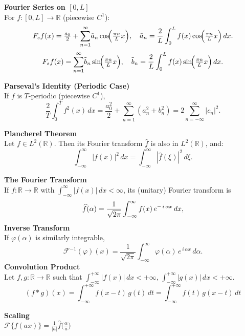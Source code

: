 \documentclass[8pt]{article}
\begin{document}
\begin{multicols}{2}
	\noindent \textbf{Fourier Series on $[0,L]$}\\
	For $f:[0,L]\to \mathbb{R}$ (piecewise $C^1$):
	\[
		F_{c}f(x)=\tfrac{\tilde a_{0}}{2} + \sum_{n=1}^{\infty}\!\tilde a_{n}\cos\!\Bigl(\tfrac{\pi n}{L}x\Bigr),
		\quad \tilde a_{n}=\frac{2}{L}\int_{0}^{L} f(x)\cos\!\Bigl(\tfrac{\pi n}{L}x\Bigr)\,dx.
	\]
	\[
		F_{s}f(x)=\sum_{n=1}^{\infty}\!\tilde b_{n}\sin\!\Bigl(\tfrac{\pi n}{L}x\Bigr),
		\quad \tilde b_{n}=\frac{2}{L}\int_{0}^{L} f(x)\sin\!\Bigl(\tfrac{\pi n}{L}x\Bigr)\,dx.
	\]

	\noindent \textbf{Parseval's Identity (Periodic Case)}\\
	If $f$ is $T$-periodic (piecewise $C^1$),
	\[
		\frac{2}{T}\int_{0}^{T} f^{2}(x)\,dx
		= \frac{a_{0}^{2}}{2} + \sum_{n=1}^{\infty}(a_{n}^{2}+b_{n}^{2})
		= 2\sum_{n=-\infty}^{\infty}\!\!\bigl|c_{n}\bigr|^{2}.
	\]

	\noindent \textbf{Plancherel Theorem}\\
	Let $f \in L^2(\mathbb{R})$. Then its Fourier transform $\hat{f}$ is also in $L^2(\mathbb{R})$, and:
	\[
		\int_{-\infty}^\infty |f(x)|^2 \, dx
		= \int_{-\infty}^\infty |\hat{f}(\xi)|^2 \, d\xi.
	\]

	\noindent \textbf{The Fourier Transform}\\
	If $f:\mathbb{R}\to\mathbb{R}$ with $\int_{-\infty}^{\infty}\!|f(x)|\,dx<\infty$, its (unitary) Fourier transform is
	\[
		\widehat{f}(\alpha)=\frac{1}{\sqrt{2\pi}}
		\int_{-\infty}^{\infty} f(x)\, e^{-\,i\,\alpha x}\,dx, \vspace{-10px}
	\]
	\noindent \textbf{Inverse Transform}\\
	If $\varphi(\alpha)$ is similarly integrable,
	\[
		\mathcal{F}^{-1}(\varphi)(x)= \frac{1}{\sqrt{2\pi}}
		\int_{-\infty}^{\infty}\!\varphi(\alpha)\,e^{\,i\,\alpha x}\,d\alpha.
	\]
	\noindent \textbf{Convolution Product}\\
	Let \(f,g:\mathbb{R} \to \mathbb{R}\) such that
	\(\int_{-\infty}^{+\infty} |f(x)|\,dx < +\infty\),
	\(\int_{-\infty}^{+\infty} |g(x)|\,dx < +\infty\). \vspace{-5px}
	\[
		(f * g)(x)
		= \int_{-\infty}^{+\infty} f(x - t)\,g(t)\,dt
		= \int_{-\infty}^{+\infty} f(t)\,g(x - t)\,dt
	\]

	\vfill
	\setlength{\columnsep}{-70pt} %
	\hspace{-15px}
	\normalsize
	\begin{minipage}[htp]{0.55\textwidth}
		\begin{multicols}{2}
			\textbf{Scaling} \\
			$\mathcal{F}\{f(ax)\} = \frac{1}{|a|} \hat{f}\!\bigl(\tfrac{\alpha}{a}\bigr)$ \\[4pt]


\end{multicols}
\end{minipage}
\end{multicols}
\end{document}
